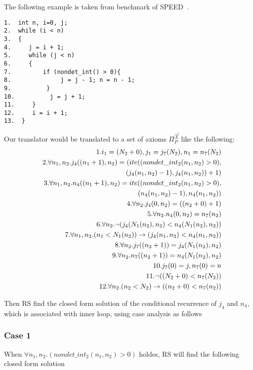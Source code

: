 The following example is taken from benchmark of SPEED~\cite{speed1}.
\begin{verbatim}
1.  int n, i=0, j;
2.  while (i < n)
3.  {
4.     j = i + 1;
5.     while (j < n)
6.     {
7.         if (nondet_int() > 0){
8.              j = j - 1; n = n - 1;
9.          }
10.          j = j + 1;
11.     }
12.     i = i + 1;
13.  }
\end{verbatim}







Our translator would be translated to a set of axioms $\Pi_P^{\vec{X}}$ like the following:
\begin{eqnarray*}
	&&1.i_1 = (N_2+0), j_1 = j_7(N_2), n_1 = n_7(N_2)\\
	&&2.\forall n_1,n_2.j_4((n_1+1),n_2) = (ite((nondet\_int_2(n_1,n_2)>0),\\ &&\hspace*{5em}(j_4(n_1,n_2)-1),j_4(n_1,n_2))+1)\\ 
	&&3.\forall n_1,n_2.n_4((n_1+1),n_2) = ite((nondet\_int_2(n_1,n_2)>0),\\ &&\hspace*{5em}(n_4(n_1,n_2)-1),n_4(n_1,n_2))\\ 
	&&4.\forall n_2.j_4(0,n_2) = ((n_2+0)+1)\\
	&&5.\forall n_2.n_4(0,n_2) = n_7(n_2)\\
	&&6.\forall n_2.\neg (j_4(N_1(n_2),n_2)<n_4(N_1(n_2),n_2))\\
	&&7.\forall n_1,n_2.(n_1<N_1(n_2)) \rightarrow (j_4(n_1,n_2)<n_4(n_1,n_2))\\
	&&8.\forall n_2.j_7((n_2+1)) = j_4(N_1(n_2),n_2)\\
	&&9.\forall n_2.n_7((n_2+1)) = n_4(N_1(n_2),n_2)\\
	&&10.j_7(0) = j, n_7(0) = n\\
	&&11.\neg ((N_2+0)<n_7(N_2))\\
	&&12.\forall n_2.(n_2<N_2) \rightarrow ((n_2+0)<n_7(n_2))
\end{eqnarray*}

Then RS find the closed form solution of the conditional recurrence of $j_4$ and $n_4$, which is associated  with inner loop, using case analysis as follows
\subsubsection{Case 1} When $\forall n_1,n_2.(nondet\_int_2(n_1,n_2)>0)$ holdes, RS will find the following closed form solution

